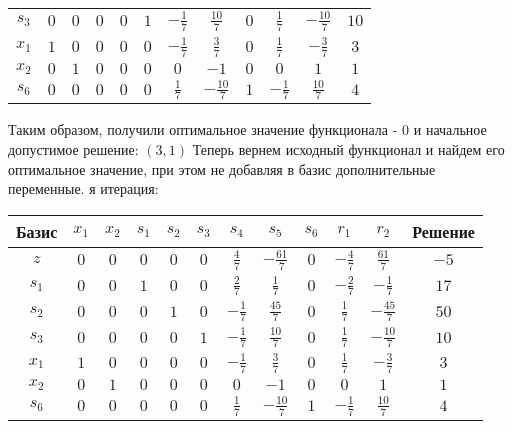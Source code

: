 \documentclass{article}%
\begin{document}
\begin{flushleft}
\begin{tabular}{|c|cccccccccc|c|}
$s_{3}$&$0$&$0$&$0$&$0$&$1$&$-\frac{1}{7}$&$\frac{10}{7}$&$0$&$\frac{1}{7}$&$-\frac{10}{7}$&$10$\\%
$x_{1}$&$1$&$0$&$0$&$0$&$0$&$-\frac{1}{7}$&$\frac{3}{7}$&$0$&$\frac{1}{7}$&$-\frac{3}{7}$&$3$\\%
$x_{2}$&$0$&$1$&$0$&$0$&$0$&$0$&$-1$&$0$&$0$&$1$&$1$\\%
$s_{6}$&$0$&$0$&$0$&$0$&$0$&$\frac{1}{7}$&$-\frac{10}{7}$&$1$&$-\frac{1}{7}$&$\frac{10}{7}$&$4$\\%
\hline%
\end{tabular}%
\newline%
\newline%
Таким образом, получили оптимальное значение функционала {-} 0 и начальное допустимое решение: %
$(3, 1)$%
\newline%
Теперь вернем исходный функционал и найдем его оптимальное значение, при этом не добавляя в базис дополнительные переменные.%
я итерация: %
\newline%
\newline%
\renewcommand{\arraystretch}{1.3}%
\begin{tabular}{|c|cccccccccc|c|}%
\hline%
Базис&$x_{1}$&$x_{2}$&$s_{1}$&$s_{2}$&$s_{3}$&$s_{4}$&$s_{5}$&$s_{6}$&$r_{1}$&$r_{2}$&Решение\\%
\hline%
$z$&$0$&$0$&$0$&$0$&$0$&$\frac{4}{7}$&$-\frac{61}{7}$&$0$&$-\frac{4}{7}$&$\frac{61}{7}$&$-5$\\%
\hline%
$s_{1}$&$0$&$0$&$1$&$0$&$0$&$\frac{2}{7}$&$\frac{1}{7}$&$0$&$-\frac{2}{7}$&$-\frac{1}{7}$&$17$\\%
$s_{2}$&$0$&$0$&$0$&$1$&$0$&$-\frac{1}{7}$&$\frac{45}{7}$&$0$&$\frac{1}{7}$&$-\frac{45}{7}$&$50$\\%
$s_{3}$&$0$&$0$&$0$&$0$&$1$&$-\frac{1}{7}$&$\frac{10}{7}$&$0$&$\frac{1}{7}$&$-\frac{10}{7}$&$10$\\%
$x_{1}$&$1$&$0$&$0$&$0$&$0$&$-\frac{1}{7}$&$\frac{3}{7}$&$0$&$\frac{1}{7}$&$-\frac{3}{7}$&$3$\\%
$x_{2}$&$0$&$1$&$0$&$0$&$0$&$0$&$-1$&$0$&$0$&$1$&$1$\\%
$s_{6}$&$0$&$0$&$0$&$0$&$0$&$\frac{1}{7}$&$-\frac{10}{7}$&$1$&$-\frac{1}{7}$&$\frac{10}{7}$&$4$\\%
\hline%
\end{tabular}%
\newline%
\newline%
\newline%
\begin{tabular}{|cccc|}%

\end{tabular}
\end{flushleft}
\end{document}
